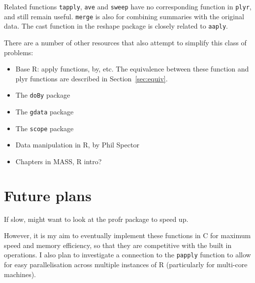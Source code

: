 \documentclass[letterpaper,oneside]{scrartcl}
\begin{document}
Related functions {\tt tapply}, {\tt ave} and {\tt sweep} have no corresponding function in {\tt plyr}, and still remain useful. {\tt merge} is also for combining summaries with the original data.  The cast function in the reshape package \citep{reshape} is closely related to {\tt aaply}.

There are a number of other resources that also attempt to simplify this class of problems:

\begin{itemize}
  \item Base R:  apply functions, by, etc.  The equivalence between these function and plyr functions are described in Section~\ref{sec:equiv}.
  
  \item The {\tt doBy} package
  \item The {\tt gdata} package
  \item The {\tt scope} package
  \item Data manipulation in R, by Phil Spector
  \item Chapters in MASS, R intro?
  
\end{itemize}

\section{Future plans}
\label{sec:future}

If slow, might want to look at the profr package to speed up.  

However, it is my aim to eventually implement these functions in C for maximum speed and memory efficiency, so that they are competitive with the built in operations.  I also plan to investigate a connection to the {\tt papply} function to allow for easy parallelisation across multiple instances of R (particularly for multi-core machines).


\end{document}
